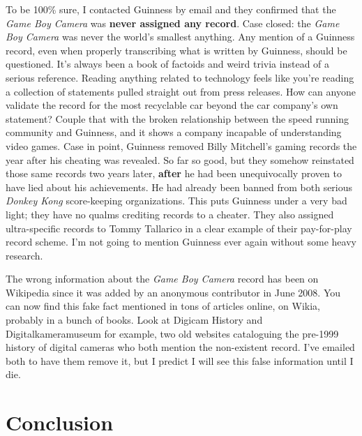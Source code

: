 \documentclass{book}
\begin{document}
To be 100\% sure, I contacted Guinness by email and they confirmed that the \emph{Game Boy Camera} was \textbf{never assigned any record}. Case closed: the \emph{Game Boy Camera} was never the world’s smallest anything. Any mention of a Guinness record, even when properly transcribing what is written by Guinness, should be questioned. It’s always been a book of factoids and weird trivia instead of a serious reference. Reading anything related to technology feels like you’re reading a collection of statements pulled straight out from press releases. How can anyone validate the record for the most recyclable car beyond the car company’s own statement? Couple that with the broken relationship between the speed running community and Guinness, and it shows a company incapable of understanding video games. Case in point, Guinness removed Billy Mitchell’s gaming records the year after his cheating was revealed. So far so good, but they somehow reinstated those same records two years later, \textbf{after} he had been unequivocally proven to have lied about his achievements. He had already been banned from both serious \emph{Donkey Kong} score-keeping organizations. This puts Guinness under a very bad light; they have no qualms crediting records to a cheater. They also assigned ultra-specific records to Tommy Tallarico in a clear example of their pay-for-play record scheme. I’m not going to mention Guinness ever again without some heavy research.

The wrong information about the \emph{Game Boy Camera} record has been on Wikipedia since it was added by an anonymous contributor in June 2008. You can now find this fake fact mentioned in tons of articles online, on Wikia, probably in a bunch of books. Look at Digicam History and Digitalkameramuseum for example, two old websites cataloguing the pre-1999 history of digital cameras who both mention the non-existent record. I’ve emailed both to have them remove it, but I predict I will see this false information until I die.

\FloatBarrier\needspace{10mm}\section*{Conclusion}\nopagebreak[4]
\end{document}
